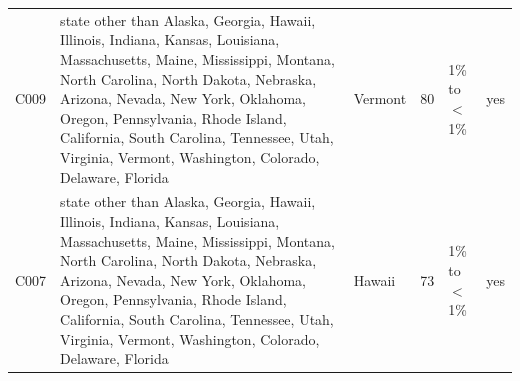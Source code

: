 \documentclass[a4paper,10pt]{article}
\newif\ifreviewmarks
\newcommand{\reviewrule}{\noindent{\color{BrickRed}\rule{\linewidth}{0.8pt}}}
\newenvironment{drafted}[1][]{%
  \ifreviewmarks\par\addvspace{\medskipamount}\reviewrule\par\nopagebreak
  \noindent{\color{BrickRed}\sffamily\footnotesize\textbf{Thesis Draft}\quad #1\hfill review}\par\nopagebreak\smallskip\fi}{%
  \ifreviewmarks\par\smallskip\noindent{\color{BrickRed}\sffamily\footnotesize end of thesis draft}\par\nopagebreak\reviewrule\par\medskip\fi}
\begin{document}
\begin{drafted}[plain-language layer: churn100-s4-c3]
{\begin{longtable}{@{}lllrlc@{}}
C009 & state other than Alaska, Georgia, Hawaii, Illinois, Indiana, Kansas, Louisiana, Massachusetts, Maine, Mississippi, Montana, North Carolina, North Dakota, Nebraska, Arizona, Nevada, New York, Oklahoma, Oregon, Pennsylvania, Rhode Island, California, South Carolina, Tennessee, Utah, Virginia, Vermont, Washington, Colorado, Delaware, Florida & Vermont & 80 & 1\% to $<$1\% & \textcolor{OliveGreen}{yes} \\
C007 & state other than Alaska, Georgia, Hawaii, Illinois, Indiana, Kansas, Louisiana, Massachusetts, Maine, Mississippi, Montana, North Carolina, North Dakota, Nebraska, Arizona, Nevada, New York, Oklahoma, Oregon, Pennsylvania, Rhode Island, California, South Carolina, Tennessee, Utah, Virginia, Vermont, Washington, Colorado, Delaware, Florida & Hawaii & 73 & 1\% to $<$1\% & \textcolor{OliveGreen}{yes} \\
\end{longtable}}

\end{drafted}
\end{document}
